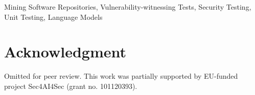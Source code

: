 \documentclass[10pt,conference]{IEEEtran}
\begin{document}

\begin{IEEEkeywords}
Mining Software Repositories, Vulnerability-witnessing Tests, Security Testing, Unit Testing, Language Models
\end{IEEEkeywords}



%









\section*{Acknowledgment}
{Omitted for peer review.}
{This work was partially supported by EU-funded project Sec4AI4Sec (grant no. 101120393).}

%


\end{document}
